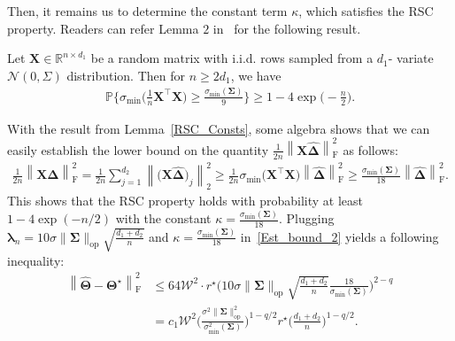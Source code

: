 \documentclass[alpha-refs]{wiley-article}
\begin{document}
\noindent 
Then, it remains us to determine the constant term $\kappa$, which satisfies the RSC property.
Readers can refer Lemma $2$ in~\citet{negahban2011estimation} for the following result.
\begin{lemma}\label{RSC_Consts}
Let $\boldsymbol{X} \in \mathbb{R}^{n \times d_{1}}$ be a random matrix with i.i.d. rows sampled from a $d_{1}$-
variate $\mathcal{N}(0,\Sigma)$ distribution. Then for $n \geq 2d_{1}$, we have 
\begin{align*}
    \mathbb{P}\Bigg\{ \sigma_{\text{min}}\bigg(\frac{1}{n}\boldsymbol{X}^{\top}\boldsymbol{X}\bigg) \geq \frac{\sigma_{\text{min}}(\boldsymbol{\Sigma})}{9} \Bigg\} \geq 1 - 4\exp \bigg( -\frac{n}{2} \bigg).
\end{align*}
\end{lemma}
\noindent
With the result from Lemma~\ref{RSC_Consts}, some algebra shows that 
we can easily establish the lower bound on the quantity $\frac{1}{2n} \left\| \boldsymbol{X}\boldsymbol{\widehat{\Delta}} \right\|_{\text{F}}^{2}$ as follows: 
\begin{align*}
    \frac{1}{2n} \left\| \boldsymbol{X}\boldsymbol{\widehat{\Delta}} \right\|_{\text{F}}^{2}
    = \frac{1}{2n} \sum_{j=1}^{d_{2}} \left\| \big(\boldsymbol{X}\boldsymbol{\widehat{\Delta}}\big)_{j} \right\|_{2}^{2}
    \geq \frac{1}{2n}\sigma_{\text{min}}\big( \boldsymbol{X}^{\top} \boldsymbol{X} \big) 
    \left\| \boldsymbol{\widehat{\Delta}} \right\|_{\text{F}}^{2} 
    \geq \frac{\sigma_{\text{min}}(\boldsymbol{\Sigma})}{18} \left\| \boldsymbol{\widehat{\Delta}} \right\|_{\text{F}}^{2}.
\end{align*}
This shows that the RSC property holds with probability at least $ 1 - 4\exp ( -n/2 )$ with the constant $\kappa=\frac{\sigma_{\text{min}}(\boldsymbol{\Sigma})}{18}$. 
Plugging $\boldsymbol{\lambda}_{n}=10 \sigma \|\boldsymbol{\Sigma}\|_{\text{op}} \sqrt{\frac{d_{1}+d_{2}}{n}}$ and $\kappa = \frac{\sigma_{\text{min}}(\boldsymbol{\Sigma})}{18}$ in~\eqref{Est_bound_2} yields a following inequality:
\begin{align*}
    \left\| \widehat{\boldsymbol{\Theta}} - \boldsymbol{\Theta^{\star}} \right\|_{\text{F}}^{2}
    &\leq 64 \mathcal{W}^{2} \cdot r^{\star} \Bigg(10 \sigma \|\boldsymbol{\Sigma}\|_{\text{op}} \sqrt{\frac{d_{1}+d_{2}}{n}} \frac{18}{\sigma_{\text{min}}(\boldsymbol{\Sigma})} \Bigg)^{2-q} \\
    &= c_{1} \mathcal{W}^{2} \Bigg( \frac{\sigma^{2}\|\boldsymbol{\Sigma}\|_{\text{op}}^{2}}{\sigma_{\text{min}}^{2}(\boldsymbol{\Sigma})} \Bigg)^{1-q/2} r^{\star} \Bigg( \frac{d_{1}+d_{2}}{n} \Bigg)^{1-q/2}.
\end{align*}
\end{document}
